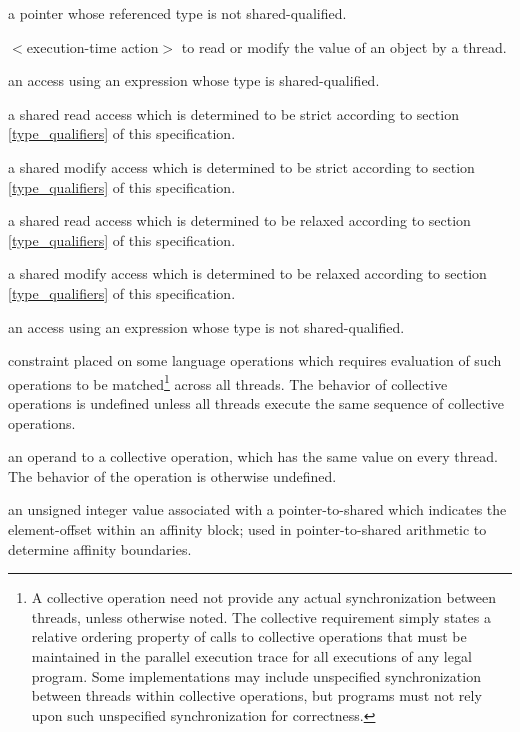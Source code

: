 %
     a pointer whose referenced type is not
     shared-qualified.

\label{def-access}
%
     $<$execution-time action$>$ to read or
     modify the value of an object by a thread.

%
     an access using an expression whose type
     is shared-qualified.

%
     a shared read access which is determined to be
     strict according to section \ref{type_qualifiers} of this specification.

%
     a shared modify access which is determined to be
     strict according to section \ref{type_qualifiers} of this specification.

%
     a shared read access which is determined to be
     relaxed according to section \ref{type_qualifiers} of this specification.

%
     a shared modify access which is determined to be
     relaxed according to section \ref{type_qualifiers} of this specification.

%
     an access using an expression whose type
     is not shared-qualified.

%
     constraint placed on some language 
     operations which requires evaluation of such operations to be
     matched\footnote{A collective operation need not provide any
     actual synchronization between threads, unless otherwise noted.
     The collective requirement simply states a relative ordering property
     of calls to collective operations that must be maintained in the
     parallel execution trace for all executions of any legal program.
     Some implementations may include unspecified synchronization between
     threads within collective operations, but programs must not rely upon
     such unspecified synchronization for correctness.} across all threads.
     The behavior of collective operations is undefined unless all threads
     execute the same sequence of collective operations.

%
     an operand to a collective operation, which has
     the same value on every thread.  The behavior of the operation
     is otherwise undefined.

%
     an unsigned integer value associated with a
     pointer-to-shared which indicates the element-offset within an
     affinity block; used in pointer-to-shared arithmetic
     to determine affinity boundaries.


